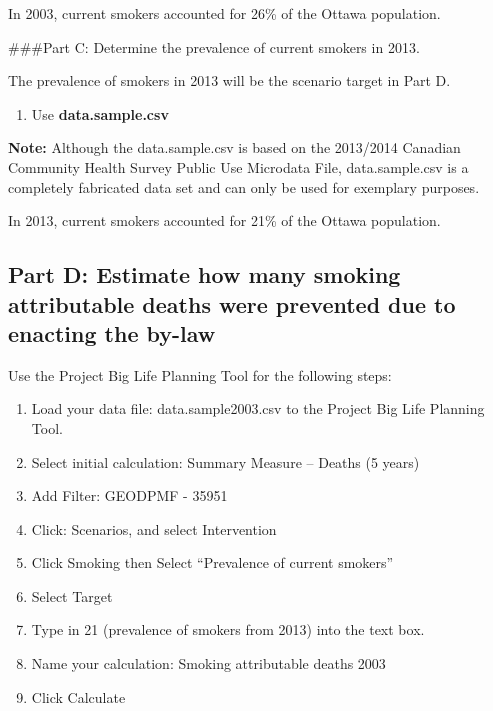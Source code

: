 \documentclass[]{book}
\providecommand{\tightlist}{%
  \setlength{\itemsep}{0pt}\setlength{\parskip}{0pt}}
\begin{document}
In 2003, current smokers accounted for 26\% of the Ottawa population.

\#\#\#Part C: Determine the prevalence of current smokers in 2013.

The prevalence of smokers in 2013 will be the scenario target in Part D.

\begin{enumerate}
\def\labelenumi{\arabic{enumi}.}
\tightlist
\item
  Use \textbf{data.sample.csv}
\end{enumerate}

\textbf{Note:} Although the data.sample.csv is based on the 2013/2014 Canadian Community Health Survey Public Use Microdata File, data.sample.csv is a completely fabricated data set and can only be used for exemplary purposes.

In 2013, current smokers accounted for 21\% of the Ottawa population.

\hypertarget{part-d-estimate-how-many-smoking-attributable-deaths-were-prevented-due-to-enacting-the-by-law}{%
\subsection{Part D: Estimate how many smoking attributable deaths were prevented due to enacting the by-law}\label{part-d-estimate-how-many-smoking-attributable-deaths-were-prevented-due-to-enacting-the-by-law}}

Use the Project Big Life Planning Tool for the following steps:

\begin{enumerate}
\def\labelenumi{\arabic{enumi}.}
\item
  Load your data file: data.sample2003.csv to the Project Big Life Planning Tool.
\item
  Select initial calculation: Summary Measure -- Deaths (5 years)
\item
  Add Filter: GEODPMF - 35951
\item
  Click: Scenarios, and select Intervention
\item
  Click Smoking then Select ``Prevalence of current smokers''
\item
  Select Target
\item
  Type in 21 (prevalence of smokers from 2013) into the text box.
\item
  Name your calculation: Smoking attributable deaths 2003
\item
  Click Calculate
\end{enumerate}
\end{document}
